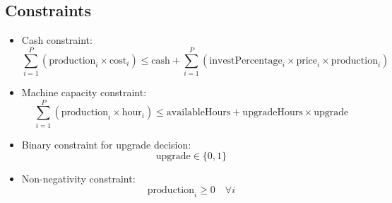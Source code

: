 \documentclass{article}
\begin{document}
\subsection*{Constraints}

\begin{itemize}
    \item Cash constraint:
    \[
    \sum_{i=1}^{P} (\text{production}_i \times \text{cost}_i) \leq \text{cash} + \sum_{i=1}^{P} (\text{investPercentage}_i \times \text{price}_i \times \text{production}_i)
    \]

    \item Machine capacity constraint:
    \[
    \sum_{i=1}^{P} (\text{production}_i \times \text{hour}_i) \leq \text{availableHours} + \text{upgradeHours} \times \text{upgrade}
    \]

    \item Binary constraint for upgrade decision:
    \[
    \text{upgrade} \in \{0, 1\}
    \]

    \item Non-negativity constraint:
    \[
    \text{production}_i \geq 0 \quad \forall i
    \]
\end{itemize}
\end{document}
